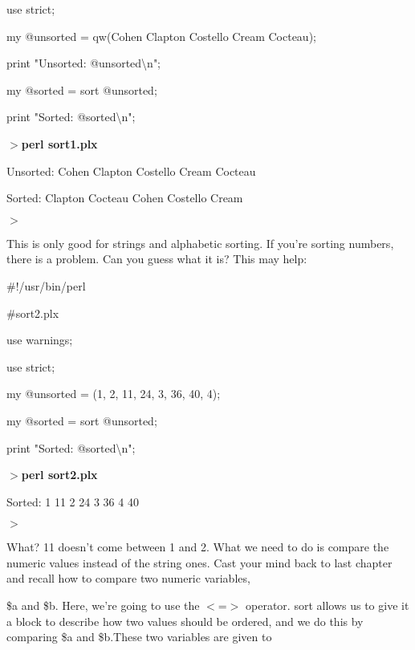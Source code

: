 \documentclass[a4paper,11pt]{book}
\begin{document}
\noindent use strict;

\noindent 

\noindent my @unsorted = qw(Cohen Clapton Costello Cream Cocteau);

\noindent print "Unsorted: @unsorted\textbackslash n";

\noindent my @sorted = sort @unsorted;

\noindent print "Sorted: @sorted\textbackslash n";

\noindent 

\noindent $>$\textbf{perl sort1.plx}

\noindent Unsorted: Cohen Clapton Costello Cream Cocteau

\noindent Sorted: Clapton Cocteau Cohen Costello Cream

\noindent $>$

\noindent 

\noindent This is only good for strings and alphabetic sorting. If you're sorting numbers, there is a problem. Can you guess what it is? This may help:

\noindent 

\noindent 

\noindent \#!/usr/bin/perl

\noindent \#sort2.plx

\noindent use warnings;

\noindent use strict;

\noindent 

\noindent my @unsorted = (1, 2, 11, 24, 3, 36, 40, 4);

\noindent my @sorted = sort @unsorted;

\noindent print "Sorted: @sorted\textbackslash n";

\noindent 

\noindent $>$\textbf{perl sort2.plx}

\noindent Sorted:   1 11 2 24 3 36 4 40

\noindent $>$

\noindent 

\noindent What? 11 doesn't come between 1 and 2. What we need to do is compare the numeric values instead of the string ones. Cast your mind back to last chapter and recall how to compare two numeric variables,

\noindent \$a and \$b. Here, we're going to use the $<$=$>$ operator. sort allows us to give it a block to describe how two values should be ordered, and we do this by comparing \$a and \$b.These two variables are given to
\end{document}
